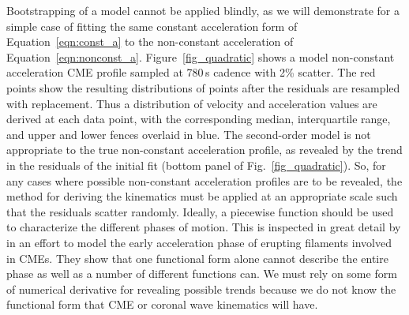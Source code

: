 \documentclass[referee]{aa}
\begin{document}
Bootstrapping of a model cannot be applied blindly, as we will demonstrate for a simple case of fitting the same constant acceleration form of Equation~\ref{eqn:const_a} to the non-constant acceleration of Equation~\ref{eqn:nonconst_a}. Figure~\ref{fig_quadratic} shows a model non-constant acceleration CME profile sampled at 780\,s cadence with 2\% scatter. The red points show the resulting distributions of points after the residuals are resampled with replacement. Thus a distribution of velocity and acceleration values are derived at each data point, with the corresponding median, interquartile range, and upper and lower fences overlaid in blue. The second-order model is not appropriate to the true non-constant acceleration profile, as revealed by the trend in the residuals of the initial fit (bottom panel of Fig.~\ref{fig_quadratic}). So, for any cases where possible non-constant acceleration profiles are to be revealed, the method for deriving the kinematics must be applied at an appropriate scale such that the residuals scatter randomly. Ideally, a piecewise function should be used to characterize the different phases of motion. This is inspected in great detail by \citet{2008ApJ...674..586S} in an effort to model the early acceleration phase of erupting filaments involved in CMEs. They show that one functional form alone cannot describe the entire phase as well as a number of different functions can. We must rely on some form of numerical derivative for revealing possible trends because we do not know the functional form that CME or coronal wave kinematics will have.
\end{document}
